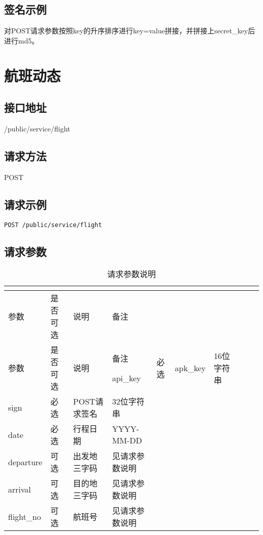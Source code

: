 \section{签名示例}

对POST请求参数按照key的升序排序进行key=value拼接，并拼接上secret\_key后进行md5。



\chapter{航班动态}


\section{接口地址}

/public/service/flight

\section{请求方法}


POST

\section{请求示例}

\texttt{POST /public/service/flight}


\section{请求参数}



\begin{longtable}{|m{60pt}|m{50pt}|m{80pt}|m{200pt}|}
\tabularnewline\hline
参数&是否可选&说明&备注
\endhead

\caption{请求参数说明}\\
\hline
参数&是否可选&说明&备注
\endfirsthead

\endfoot

\endlastfoot
\hline
api\_key   & 必选 & apk\_key & 16位字符串\\
\hline
sign            &必选 & POST请求签名& 32位字符串\\
\hline
date	            &必选 & 行程日期         &YYYY-MM-DD\\
\hline
departure &可选 &	出发地三字码 &见请求参数说明\\
\hline
arrival        &可选 & 目的地三字码 &见请求参数说明\\
\hline
flight\_no &可选 & 航班号             &见请求参数说明\\
\hline
\end{longtable}

